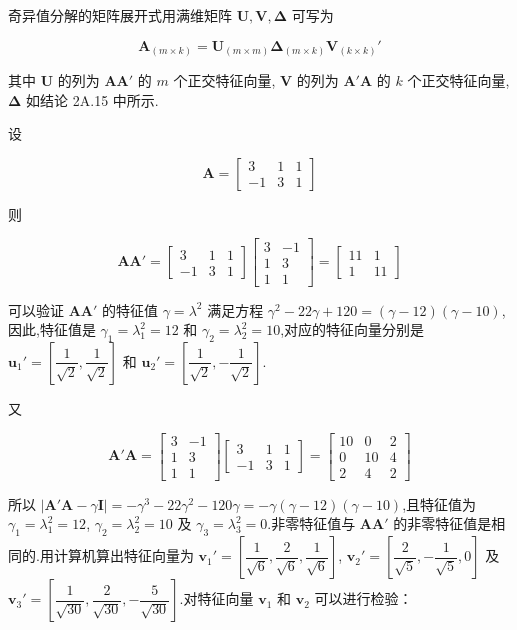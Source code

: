 
奇异值分解的矩阵展开式用满维矩阵 $\bm{U}, \bm{V}, \bm{\Delta}$ 可写为

\[
\bm{A}_{(m \times k)} = \bm{U}_{(m \times m)}\bm{\Delta}_{(m \times k)}\bm{V}_{(k \times k)}'
\]

其中 $\bm{U}$ 的列为 $\bm{A}\bm{A}'$ 的 $m$ 个正交特征向量, $\bm{V}$ 的列为 $\bm{A}'\bm{A}$ 的 $k$ 个正交特征向量, $\bm{\Delta}$ 如结论 2A.15 中所示.

设

\[
\bm{A} = \begin{bmatrix} 3 & 1 & 1 \\ -1 & 3 & 1 \end{bmatrix}
\]

则

\[
\bm{A}\bm{A}' = \begin{bmatrix} 3 & 1 & 1 \\ -1 & 3 & 1 \end{bmatrix}\begin{bmatrix} 3 & -1 \\ 1 & 3 \\ 1 & 1 \end{bmatrix} = \begin{bmatrix} 11 & 1 \\ 1 & 11 \end{bmatrix}
\]

可以验证 $\bm{A}\bm{A}'$ 的特征值 $\gamma = \lambda^2$ 满足方程 $\gamma^2 - 22\gamma + 120 = (\gamma - 12)(\gamma - 10)$,因此,特征值是 $\gamma_1 = \lambda_1^2 = 12$ 和 $\gamma_2 = \lambda_2^2 = 10$,对应的特征向量分别是 $\bm{u}_1' = \left[\dfrac{1}{\sqrt{2}}, \dfrac{1}{\sqrt{2}}\right]$ 和 $\bm{u}_2' = \left[\dfrac{1}{\sqrt{2}}, -\dfrac{1}{\sqrt{2}}\right]$.

又

\[
\bm{A}'\bm{A} = \begin{bmatrix} 3 & -1 \\ 1 & 3 \\ 1 & 1 \end{bmatrix}\begin{bmatrix} 3 & 1 & 1 \\ -1 & 3 & 1 \end{bmatrix} = \begin{bmatrix} 10 & 0 & 2 \\ 0 & 10 & 4 \\ 2 & 4 & 2 \end{bmatrix}
\]

所以 $|\bm{A}'\bm{A} - \gamma\bm{I}| = -\gamma^3 - 22\gamma^2 - 120\gamma = -\gamma(\gamma - 12)(\gamma - 10)$,且特征值为 $\gamma_1 = \lambda_1^2 = 12$, $\gamma_2 = \lambda_2^2 = 10$ 及 $\gamma_3 = \lambda_3^2 = 0$.非零特征值与 $\bm{A}\bm{A}'$ 的非零特征值是相同的.用计算机算出特征向量为 $\bm{v}_1' = \left[\dfrac{1}{\sqrt{6}}, \dfrac{2}{\sqrt{6}}, \dfrac{1}{\sqrt{6}}\right]$, $\bm{v}_2' = \left[\dfrac{2}{\sqrt{5}}, -\dfrac{1}{\sqrt{5}}, 0\right]$ 及 $\bm{v}_3' = \left[\dfrac{1}{\sqrt{30}}, \dfrac{2}{\sqrt{30}}, -\dfrac{5}{\sqrt{30}}\right]$.对特征向量 $\bm{v}_1$ 和 $\bm{v}_2$ 可以进行检验：

